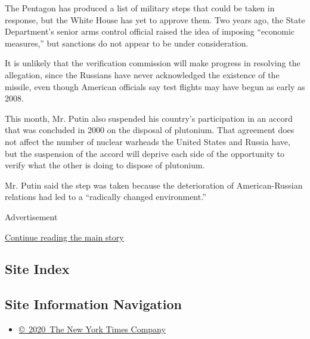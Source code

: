 The Pentagon has produced a list of military steps that could be taken
in response, but the White House has yet to approve them. Two years ago,
the State Department's senior arms control official raised the idea of
imposing ``economic measures,'' but sanctions do not appear to be under
consideration.

It is unlikely that the verification commission will make progress in
resolving the allegation, since the Russians have never acknowledged the
existence of the missile, even though American officials say test
flights may have begun as early as 2008.

This month, Mr. Putin also suspended his country's participation in an
accord that was concluded in 2000 on the disposal of plutonium. That
agreement does not affect the number of nuclear warheads the United
States and Russia have, but the suspension of the accord will deprive
each side of the opportunity to verify what the other is doing to
dispose of plutonium.

Mr. Putin said the step was taken because the deterioration of
American-Russian relations had led to a ``radically changed
environment.''

Advertisement

\protect\hyperlink{after-bottom}{Continue reading the main story}

\hypertarget{site-index}{%
\subsection{Site Index}\label{site-index}}

\hypertarget{site-information-navigation}{%
\subsection{Site Information
Navigation}\label{site-information-navigation}}

\begin{itemize}
\tightlist
\item
  \href{https://help.nytimes.com/hc/en-us/articles/115014792127-Copyright-notice}{©~2020~The
  New York Times Company}
\end{itemize}

